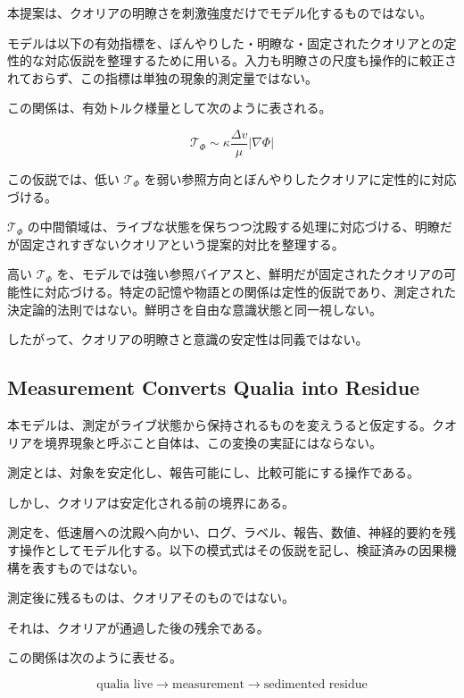 本提案は、クオリアの明瞭さを刺激強度だけでモデル化するものではない。

モデルは以下の有効指標を、ぼんやりした・明瞭な・固定されたクオリアとの定性的な対応仮説を整理するために用いる。入力も明瞭さの尺度も操作的に較正されておらず、この指標は単独の現象的測定量ではない。

この関係は、有効トルク様量として次のように表される。

\begin{equation}
\mathcal{T}_{\Phi}
\sim
\kappa
\frac{\Delta v}{\mu}
|\nabla \Phi|
\end{equation}

この仮説では、低い $\mathcal{T}_{\Phi}$ を弱い参照方向とぼんやりしたクオリアに定性的に対応づける。

$\mathcal{T}_{\Phi}$ の中間領域は、ライブな状態を保ちつつ沈殿する処理に対応づける、明瞭だが固定されすぎないクオリアという提案的対比を整理する。

高い $\mathcal{T}_{\Phi}$ を、モデルでは強い参照バイアスと、鮮明だが固定されたクオリアの可能性に対応づける。特定の記憶や物語との関係は定性的仮説であり、測定された決定論的法則ではない。鮮明さを自由な意識状態と同一視しない。

したがって、クオリアの明瞭さと意識の安定性は同義ではない。

\subsection{Measurement Converts Qualia into Residue}

本モデルは、測定がライブ状態から保持されるものを変えうると仮定する。クオリアを境界現象と呼ぶこと自体は、この変換の実証にはならない。

測定とは、対象を安定化し、報告可能にし、比較可能にする操作である。

しかし、クオリアは安定化される前の境界にある。

測定を、低速層への沈殿へ向かい、ログ、ラベル、報告、数値、神経的要約を残す操作としてモデル化する。以下の模式式はその仮説を記し、検証済みの因果機構を表すものではない。

測定後に残るものは、クオリアそのものではない。

それは、クオリアが通過した後の残余である。

この関係は次のように表せる。

\begin{equation}
\text{qualia live}
\rightarrow
\text{measurement}
\rightarrow
\text{sedimented residue}
\end{equation}

